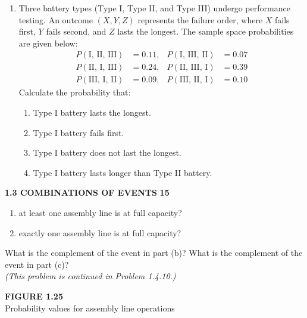 \documentclass[10pt, twocolumn]{article}
\begin{document}
\begin{enumerate}[label=\textbf{1.2.\arabic*}]
    \item Three battery types (Type I, Type II, and Type III) undergo performance testing. An outcome $(X, Y, Z)$ represents the failure order, where $X$ fails first, $Y$ fails second, and $Z$ lasts the longest. The sample space probabilities are given below:
    \begin{align*}
        P(\text{I, II, III}) &= 0.11, & P(\text{I, III, II}) &= 0.07 \\
        P(\text{II, I, III}) &= 0.24, & P(\text{II, III, I}) &= 0.39 \\
        P(\text{III, I, II}) &= 0.09, & P(\text{III, II, I}) &= 0.10
    \end{align*}
    Calculate the probability that:
    \begin{enumerate}[label=\textbf{(\alph*)}]
        \item Type I battery lasts the longest.
        \item Type I battery fails first.
        \item Type I battery does not last the longest.
        \item Type I battery lasts longer than Type II battery.
    \end{enumerate}

\end{enumerate}

\noindent\hfill \textbf{\textcolor{sectioncyan}{1.3 \quad COMBINATIONS OF EVENTS}} \quad \textbf{15}

\vspace{1em}

\begin{enumerate}[label=\textbf{(\alph*)}, start=3]
    \item at least one assembly line is at full capacity?
    \item exactly one assembly line is at full capacity?
\end{enumerate}

\noindent What is the complement of the event in part (b)? What is the complement of the event in part (c)?\\
\textit{(This problem is continued in Problem 1.4.10.)}

\vspace{1em}

\begin{center}
    \textbf{\textcolor{sectioncyan}{FIGURE 1.25}}\\[0.2em]
    \textcolor{sectioncyan}{\small Probability values for assembly line operations}
\end{center}
\end{document}
